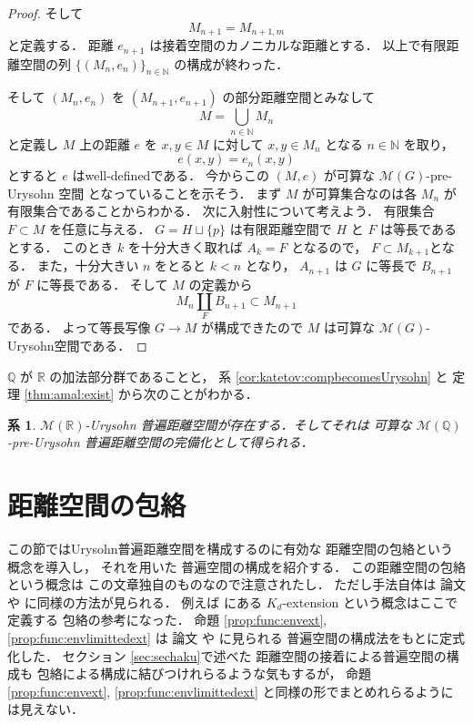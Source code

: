 \documentclass[leqno, 12pt]{jsarticle}
\newtheorem{cor}[thm]{系}
\newcommand{\nn}{\mathbb{N}}
\newcommand{\qq}{\mathbb{Q}}
\newcommand{\rr}{\mathbb{R}}
\begin{document}
\begin{proof}
そして
\[
M_{n+1}=M_{n+1, m}
\]
と定義する．
距離
$e_{n+1}$
は接着空間のカノニカルな距離とする．
以上で有限距離空間の列
$\{(M_n, e_n)\}_{n\in \nn}$
の構成が終わった．




そして
$(M_{n}, e_{n})$
を
$(M_{n+1}, e_{n+1})$
の部分距離空間とみなして
\[
M=\bigcup_{n\in \nn}M_{n}
\]
と定義し
$M$
上の距離
$e$
を
$x, y\in M$
に対して
$x, y\in M_{n}$
となる
$n\in \nn$
を取り，
\[
e(x, y)=e_n(x, y)
\]
とすると
$e$
はwell-definedである．
今からこの
$(M, e)$
が可算な
$\mathscr{M}(G)$-pre-Urysohn
空間
となっていることを示そう．
まず
$M$
が可算集合なのは各
$M_{n}$
が有限集合であることからわかる．
次に入射性について考えよう．
有限集合
$F\subset M$
を任意に与える．
$G=H\sqcup \{p\}$
は有限距離空間で
$H$
と
$F$
は等長であるとする．
このとき
$k$
を十分大きく取れば
$A_{k}=F$
となるので，
$F\subset M_{k+1}$となる．
また，十分大きい
$n$
をとると
$k<n$
となり，
$A_{n+1}$
は
$G$
に等長で
$B_{n+1}$
が
$F$
に等長である．
そして
$M$
の定義から
\[
M_{n}\coprod_{F}B_{n+1}\subset M_{n+1}
\]
である．
よって等長写像
$G\to M$
が構成できたので
$M$
は可算な
$\mathscr{M}(G)$-Urysohn空間である．
\end{proof}

$\qq$
が
$\rr$
の加法部分群であることと，
系 
\ref{cor:katetov:compbecomesUrysohn}
と
定理 
\ref{thm:amal:exist} 
から次のことがわかる．
\begin{cor}\label{cor:amal:existUrysohn}
$\mathscr{M}(\rr)$-Urysohn
普遍距離空間が存在する．そしてそれは
可算な
$\mathscr{M}(\qq)$-pre-Urysohn
普遍距離空間の完備化として得られる．
\end{cor}



\newpage
\section{距離空間の包絡}\label{sec:houraku}
この節ではUrysohn普遍距離空間を構成するのに有効な
距離空間の包絡という概念を導入し，
それを用いた
普遍空間の構成を紹介する．
この距離空間の包絡という概念は
この文章独自のものなので注意されたし．
ただし手法自体は
論文 
\cite{Ka}
や 
\cite{Greenbook}
に同様の方法が見られる．
例えば 
\cite{Greenbook}
にある
$K_{d}$-extension
という概念はここで定義する
包絡の参考になった．
命題 
\ref{prop:func:envext}, 
\ref{prop:func:envlimittedext}
は
論文 
\cite{Ka}
や 
\cite{Greenbook}
に見られる
普遍空間の構成法をもとに定式化した．
セクション
 \ref{sec:sechaku}で述べた
距離空間の接着による普遍空間の構成も
包絡による構成に結びつけれらるような気もするが，
命題 
\ref{prop:func:envext}, 
\ref{prop:func:envlimittedext}
と同様の形でまとめれらるようには見えない．
\end{document}
